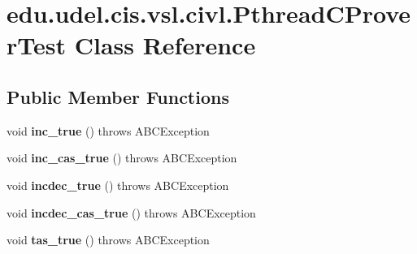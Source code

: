 \hypertarget{classedu_1_1udel_1_1cis_1_1vsl_1_1civl_1_1PthreadCProverTest}{}\section{edu.\+udel.\+cis.\+vsl.\+civl.\+Pthread\+C\+Prover\+Test Class Reference}
\label{classedu_1_1udel_1_1cis_1_1vsl_1_1civl_1_1PthreadCProverTest}
\subsection*{Public Member Functions}
\begin{DoxyCompactItemize}
\item 
\hypertarget{classedu_1_1udel_1_1cis_1_1vsl_1_1civl_1_1PthreadCProverTest_a86dd183966366ed98eebf1a65d2c5cd9}{}void {\bfseries inc\+\_\+true} ()  throws A\+B\+C\+Exception \label{classedu_1_1udel_1_1cis_1_1vsl_1_1civl_1_1PthreadCProverTest_a86dd183966366ed98eebf1a65d2c5cd9}

\item 
\hypertarget{classedu_1_1udel_1_1cis_1_1vsl_1_1civl_1_1PthreadCProverTest_a2987ee1184d61b5da4caf794d5070c9e}{}void {\bfseries inc\+\_\+cas\+\_\+true} ()  throws A\+B\+C\+Exception \label{classedu_1_1udel_1_1cis_1_1vsl_1_1civl_1_1PthreadCProverTest_a2987ee1184d61b5da4caf794d5070c9e}

\item 
\hypertarget{classedu_1_1udel_1_1cis_1_1vsl_1_1civl_1_1PthreadCProverTest_a443aa4e2e2010165f3e6ccc072c083be}{}void {\bfseries incdec\+\_\+true} ()  throws A\+B\+C\+Exception \label{classedu_1_1udel_1_1cis_1_1vsl_1_1civl_1_1PthreadCProverTest_a443aa4e2e2010165f3e6ccc072c083be}

\item 
\hypertarget{classedu_1_1udel_1_1cis_1_1vsl_1_1civl_1_1PthreadCProverTest_a582a5ca5ec73ef76c63b27ce6f25bc38}{}void {\bfseries incdec\+\_\+cas\+\_\+true} ()  throws A\+B\+C\+Exception \label{classedu_1_1udel_1_1cis_1_1vsl_1_1civl_1_1PthreadCProverTest_a582a5ca5ec73ef76c63b27ce6f25bc38}

\item 
\hypertarget{classedu_1_1udel_1_1cis_1_1vsl_1_1civl_1_1PthreadCProverTest_a06395b33cf09d98bc5829a831d7c7e81}{}void {\bfseries tas\+\_\+true} ()  throws A\+B\+C\+Exception \label{classedu_1_1udel_1_1cis_1_1vsl_1_1civl_1_1PthreadCProverTest_a06395b33cf09d98bc5829a831d7c7e81}


\end{DoxyCompactItemize}
